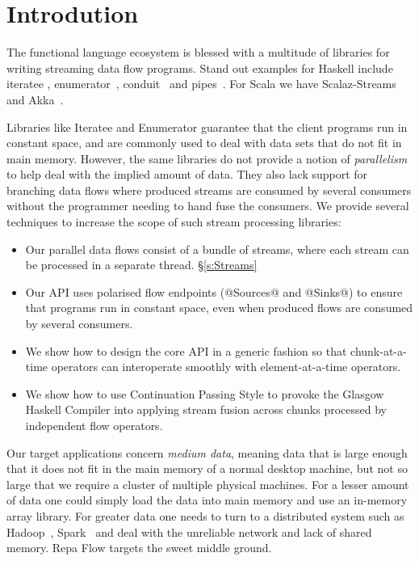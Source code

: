 \section{Introdution}

The functional language ecosystem is blessed with a multitude of libraries for writing streaming data flow programs. Stand out examples for Haskell include iteratee \cite{Kiselyov:iteratee}, enumerator~\cite{hackage:enumerator}, conduit~\cite{hackage:conduit} and pipes~\cite{hackage:pipes}. For Scala we have Scalaz-Streams~\cite{github:scalaz-streams} and Akka~\cite{github:akka}.

Libraries like Iteratee and Enumerator guarantee that the client programs run in constant space, and are commonly used to deal with data sets that do not fit in main memory. However, the same libraries do not provide a notion of \emph{parallelism} to help deal with the implied amount of data. They also lack support for branching data flows where produced streams are consumed by several consumers without the programmer needing to hand fuse the consumers. We provide several techniques to increase the scope of such stream processing libraries:

\begin{itemize}
\item Our parallel data flows consist of a bundle of streams, where each stream can be processed in a separate thread. \S\ref{s:Streams}

\item Our API uses polarised flow endpoints (@Sources@ and @Sinks@) to ensure that programs run in constant space, even when produced flows are consumed by several consumers.

\item We show how to design the core API in a generic fashion so that chunk-at-a-time operators can interoperate smoothly with element-at-a-time operators.


\item We show how to use Continuation Passing Style to provoke the Glasgow Haskell Compiler into applying stream fusion across chunks processed by independent flow operators. 



\end{itemize}

Our target applications concern \emph{medium data}, meaning data that is large enough that it does not fit in the main memory of a normal desktop machine, but not so large that we require a cluster of multiple physical machines. For a lesser amount of data one could simply load the data into main memory and use an in-memory array library. For greater data one needs to turn to a distributed system such as Hadoop~\cite{Shvachko:Hadoop}, Spark~\cite{Zaharia:RDDs} and deal with the unreliable network and lack of shared memory. Repa Flow targets the sweet middle ground.

